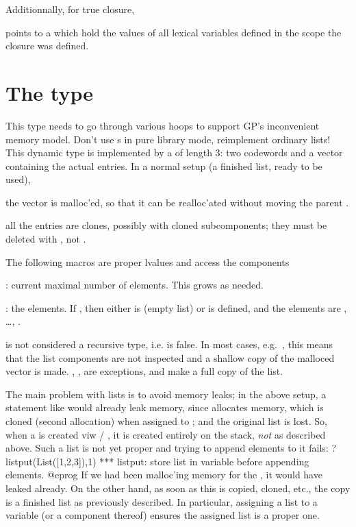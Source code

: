 Additionnally, for true closure,

\item {} points to a  which hold the values of all lexical
variables defined in the scope the closure was defined.

\section{The type } This type needs to go
through various hoops to support GP's inconvenient memory model. Don't
use s in pure library mode, reimplement ordinary lists! This
dynamic type is implemented by a  of length 3: two codewords and a
vector containing the actual entries. In a normal setup (a finished list,
ready to be used),

\item the vector is malloc'ed, so that it can be realloc'ated without moving
the parent .

\item all the entries are clones, possibly with cloned subcomponents; they
must be deleted with , not .

The following macros are proper lvalues and access the components

: current maximal number of elements. This grows
as needed.

: the elements. If , then
either  is  (empty list) or  is defined, and
the elements are , \dots, .

 is not considered a recursive type, i.e.
 is false. In most cases,
e.g.~, this means that the list components are not inspected
and a shallow copy of the malloced vector is made. , ,
 are exceptions, and make a full copy of the list.

The main problem with lists is to avoid memory leaks; in the above setup,
a statement like  would already leak memory, since
 allocates memory, which is cloned (second allocation) when
assigned to ; and the original list is lost. So,
when a  is created viw  / , it is
created entirely on the stack, \emph{not} as described above. Such
a list is not yet proper and trying to append elements to it fails:
\bprog
? listput(List([1,2,3]),1)
  *** listput: store list in variable before appending elements.
@eprog\noindent
If we had been malloc'ing memory for the
, it would have leaked already. On the other hand, as soon
as this is copied, cloned, etc., the copy is a finished list as previously
described. In particular, assigning a list to a variable (or a component
thereof) ensures the assigned list is a proper one.

